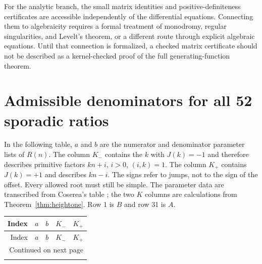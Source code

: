 \documentclass[11pt]{article}
\theoremstyle{definition}
\theoremstyle{remark}
\begin{document}
For the analytic branch, the small matrix identities and positive-definiteness
certificates are accessible independently of the differential equations.
Connecting them to algebraicity requires a formal treatment of monodromy,
regular singularities, and Levelt's theorem, or a different route through
explicit algebraic equations. Until that connection is formalized, a checked
matrix certificate should not be described as a kernel-checked proof of the
full generating-function theorem.

\appendix
\section{Admissible denominators for all 52 sporadic ratios}\label{app:atlas}
In the following table, $a$ and $b$ are the numerator and denominator
parameter lists of $R(n)$. The column $K_-$ contains the $k$ with
$J(k)=-1$ and therefore describes primitive factors $kn+i$, $i>0$,
$(i,k)=1$. The column $K_+$ contains $J(k)=+1$ and describes $kn-i$.
The signs refer to jumps, not to the sign of the offset. Every allowed
root must still be simple. The parameter data are transcribed from
Coserea's table \cite{coserea}; the two $K$ columns are calculations
from Theorem~\ref{thm:heightone}. Row 1 is $B$ and row 31 is $A$.

\small
\begin{longtable}{rllll}
\toprule
Index & $a$ & $b$ & $K_-$ & $K_+$\\
\midrule
\endfirsthead
\toprule
Index & $a$ & $b$ & $K_-$ & $K_+$\\
\midrule
\endhead
\midrule\multicolumn{5}{r}{\small Continued on next page}\\
\endfoot
\bottomrule
\endlastfoot

\end{longtable}
\normalsize

\end{document}

